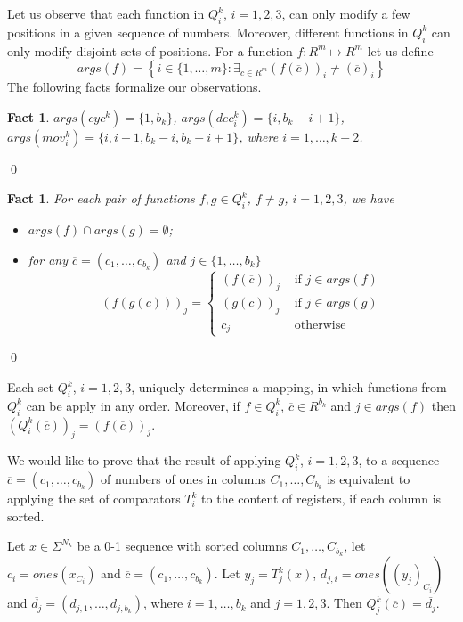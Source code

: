 \documentclass{llncs}
\newtheorem{fact}[theorem]{Fact}
\begin{document}
Let us observe that each function in $Q^k_i$, $i=1,2,3$, can only modify
a few positions in a given sequence of numbers. Moreover, different
functions in $Q^k_i$ can only modify disjoint sets of positions. For a
function $f:R^m\mapsto R^m$ let us
define $$args(f)=\left\{i\in\{1,\ldots,m\}:\exists_{\overline{c}\in R^m}
(f(\overline{c}))_i\neq (\overline{c})_i\right\}$$ The following facts
formalize our observations.
\begin{fact}
$args(cyc^k)=\{1,b_k\}$, $args(dec^k_i)=\{i,b_k-i+1\}$, 
    $args(mov^k_i)=\{i,i+1,b_k-i,b_k-i+1\}$, where $i=1,\ldots,k-2$.
\end{fact} \qed
\begin{fact}
For each pair of functions $f,g\in Q^k_i$, $f\neq g$, $i=1,2,3$, we have
\begin{itemize}
\item[(i)] $args(f) \cap args(g) = \emptyset$;
\item[(ii)] for any $\overline{c}=(c_1,\ldots,c_{b_k})$ and 
                                                  $j\in\{1,\ldots,b_k\}$
\begin{equation}
(f(g(\overline{c})))_j = \left\{ \begin{array}{ll}
(f(\overline{c}))_j & \mbox{ if } j\in args(f)\\
(g(\overline{c}))_j & \mbox{ if } j\in args(g)\\
c_j                 & \mbox{ otherwise }
\end{array}
\right.
\end{equation}
\end{itemize} 
\end{fact}  \qed
\begin{corollary} \label{color1}
Each set $Q^k_i$, $i=1,2,3$, uniquely determines a mapping, in which
functions from $Q^k_i$ can be apply in any order. Moreover, if $f\in
Q^k_i$, $\overline{c}\in R^{b_k}$ and $j\in args(f)$ then
$(Q^k_i(\overline{c}))_j = (f(\overline{c}))_j$.
\end{corollary}
We would like to prove that the result of applying $Q^k_i$, $i=1,2,3$,
to a sequence $\overline{c}=(c_1,\ldots,c_{b_k})$ of numbers of ones in
columns $C_1,\ldots,C_{b_k}$ is equivalent to applying the set of
comparators $T^k_i$ to the content of registers, if each column is
sorted.
\begin{lemma} \label{l2}
Let $x\in\Sigma^{N_k}$ be a 0-1 sequence with sorted columns $C_1, \ldots,
  C_{b_k}$, let $c_i=ones(x_{C_i})$ and $\overline{c} =
  (c_1,\ldots,c_{b_k})$. Let $y_j=T^k_j(x)$, $d_{j,i}=ones((y_j)_{C_i})$
  and $\overline{d_j} =(d_{j,1},\ldots,d_{j,b_k})$, where
  $i=1,\ldots,b_k$ and $j=1,2,3$. Then $Q^k_j(\overline{c}) = \overline{d_j}$.
\end{lemma}
\end{document}
